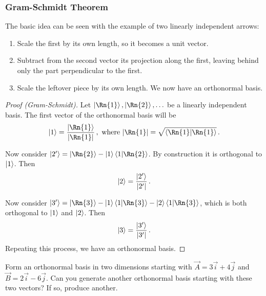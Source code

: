 
\subsubsection{Gram-Schmidt Theorem}

\begin{shaded*}
The basic idea can be seen with the example of two linearly independent arrows:
\begin{enumerate}
    \item Scale the first by its own length, so it becomes a unit vector.
    \item Subtract from the second vector its projection along the first, leaving behind only the part perpendicular to the first.
    \item Scale the leftover piece by its own length. We now have an orthonormal basis.
\end{enumerate}
\end{shaded*}

\begin{proof}[Proof (Gram-Schmidt)]
Let $\ket{\Rn{1}}, \ket{\Rn{2}}, \ldots$ be a linearly independent basis. The first vector of the orthonormal basis will be
\[\ket{1} = \frac{\ket{\Rn{1}}}{|\Rn{1}|}\,, \text{ where } |\Rn{1}| = \sqrt{\braket{\Rn{1}}}\,.\]

Now consider $\ket{2'} = \ket{\Rn{2}} - \ket{1}\braket{1}{\Rn{2}}$. By construction it is orthogonal to $\ket{1}$. Then 
\[\ket{2} = \frac{\ket{2'}}{|2'|}\,.\]

Now consider $\ket{3'} = \ket{\Rn{3}} - \ket{1}\braket{1}{\Rn{3}} - \ket{2}\braket{1}{\Rn{3}}$, which is both orthogonal to $\ket{1}$ and $\ket{2}$. Then
\[\ket{3} = \frac{\ket{3'}}{|3'|}\,.\]
Repeating this process, we have an orthonormal basis.
\end{proof}

\begin{exercise}
Form an orthonormal basis in two dimensions starting with $\vec{A} = 3\vec{i} + 4\vec{j}$ and $\vec{B} = 2\vec{i} - 6\vec{j}$. Can you generate another orthonormal basis starting with these two vectors? If so, produce another.
\end{exercise}


